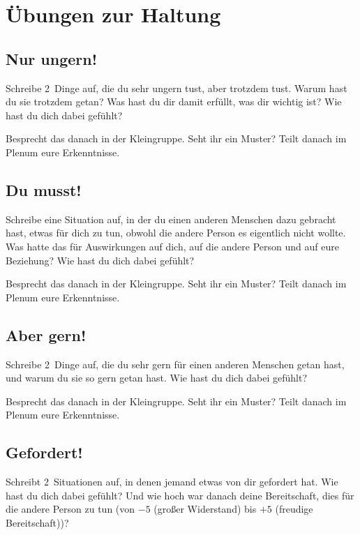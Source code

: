 \label{gfk-uebungen}


\section{Übungen zur Haltung}

\subsection{Nur ungern!}

Schreibe 2~Dinge auf, die du sehr ungern tust, aber trotzdem tust. Warum hast du sie trotzdem getan? Was hast du dir damit erfüllt, was dir wichtig ist? Wie hast du dich dabei gefühlt?

Besprecht das danach in der Kleingruppe. Seht ihr ein Muster? Teilt danach im Plenum eure Erkenntnisse.

\subsection{Du musst!}

Schreibe eine Situation auf, in der du einen anderen Menschen dazu gebracht hast, etwas für dich zu tun, obwohl die andere Person es eigentlich nicht wollte. Was hatte das für Auswirkungen auf dich, auf die andere Person und auf eure Beziehung? Wie hast du dich dabei gefühlt?

Besprecht das danach in der Kleingruppe. Seht ihr ein Muster? Teilt danach im Plenum eure Erkenntnisse.

\subsection{Aber gern!}

Schreibe 2~Dinge auf, die du sehr gern für einen anderen Menschen getan hast, und warum du sie so gern getan hast. Wie hast du dich dabei gefühlt?

Besprecht das danach in der Kleingruppe. Seht ihr ein Muster? Teilt danach im Plenum eure Erkenntnisse.

\subsection{Gefordert!}

Schreibt 2~Situationen auf, in denen jemand etwas von dir gefordert hat. Wie hast du dich dabei gefühlt? Und wie hoch war danach deine Bereitschaft, dies für die andere Person zu tun (von $-5$ (großer Widerstand) bis $+5$ (freudige Bereitschaft))?

